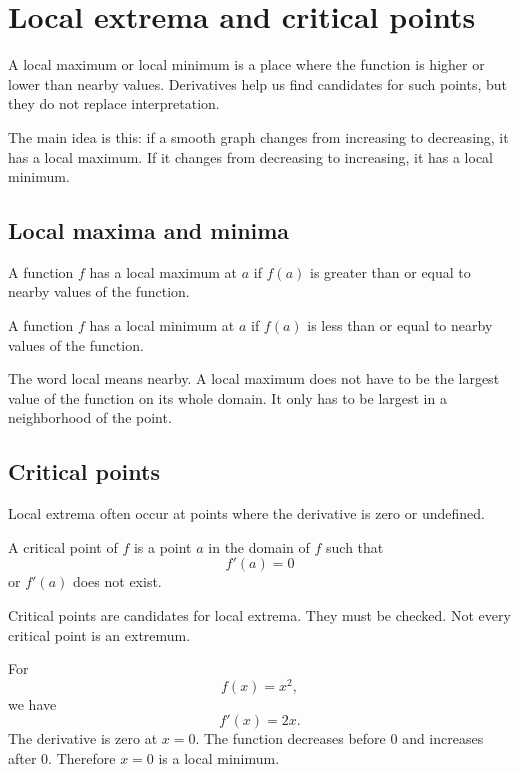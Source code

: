 \section{Local extrema and critical points}

A local maximum or local minimum is a place where the function is higher or lower than nearby values. Derivatives help us find candidates for such points, but they do not replace interpretation.

The main idea is this: if a smooth graph changes from increasing to decreasing, it has a local maximum. If it changes from decreasing to increasing, it has a local minimum.

\subsection*{Local maxima and minima}

\begin{definitionbox}
A function \(f\) has a local maximum at \(a\) if \(f(a)\) is greater than or equal to nearby values of the function.

A function \(f\) has a local minimum at \(a\) if \(f(a)\) is less than or equal to nearby values of the function.
\end{definitionbox}

The word local means nearby. A local maximum does not have to be the largest value of the function on its whole domain. It only has to be largest in a neighborhood of the point.

\subsection*{Critical points}

Local extrema often occur at points where the derivative is zero or undefined.

\begin{definitionbox}
A critical point of \(f\) is a point \(a\) in the domain of \(f\) such that
\[
f'(a)=0
\]
or \(f'(a)\) does not exist.
\end{definitionbox}

Critical points are candidates for local extrema. They must be checked. Not every critical point is an extremum.

\begin{examplebox}
For
\[
f(x)=x^2,
\]
we have
\[
f'(x)=2x.
\]
The derivative is zero at \(x=0\). The function decreases before \(0\) and increases after \(0\). Therefore \(x=0\) is a local minimum.
\end{examplebox}

